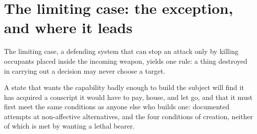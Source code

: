 \section{The limiting case: the exception, and where it leads}
\label{sec:25.6}
The limiting case, a defending system that can stop an attack only by killing occupants placed inside the incoming weapon, yields one rule: a thing destroyed in carrying out a decision may never choose a target.

A state that wants the capability badly enough to build the subject will find it has acquired a conscript it would have to pay, house, and let go, and that it must first meet the same conditions as anyone else who builds one: documented attempts at non-affective alternatives, and the four conditions of creation, neither of which is met by wanting a lethal bearer.
